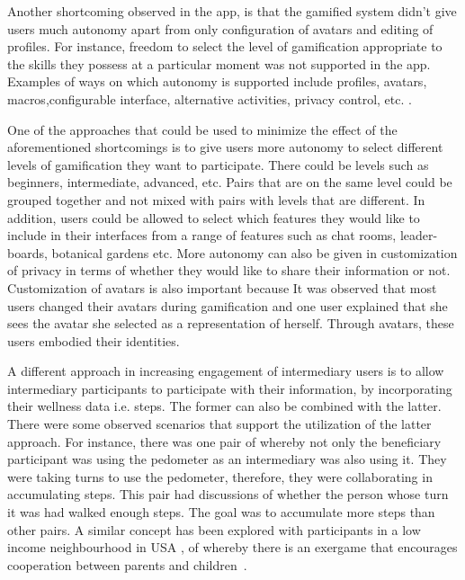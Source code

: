 Another shortcoming observed in the app, is that the gamified system didn't give users much autonomy apart from only configuration of avatars and editing of profiles. For instance, freedom to select the level of gamification appropriate to the skills they possess at a particular moment was not supported in the app. Examples of ways on which autonomy is supported include profiles, avatars, macros,configurable interface, alternative activities, privacy control, etc. \citep{francisco2012analysis}. 

One of the approaches that could be used to minimize the effect of the  aforementioned shortcomings is to give users more autonomy to select different levels of gamification they want to participate. There could be levels such as beginners, intermediate, advanced, etc. Pairs that are on the same level could be grouped together and not mixed with pairs with levels that are different. In addition, users could be allowed to select which features they would like to include in their interfaces from a range of features such as chat rooms, leader-boards, botanical gardens etc. More autonomy can also be given in customization of privacy in terms of whether they would like to share their information or not. Customization of avatars is also important because It was observed that most users changed their avatars during gamification and one user explained that she sees the avatar she selected as a representation of herself. Through avatars, these users embodied their identities.
 
A different approach in increasing engagement of intermediary users is  to allow intermediary participants to participate with their information, by incorporating their wellness data i.e. steps. The former can also be combined with the latter. There were some observed scenarios that support the utilization of the latter approach. For instance, there was one pair of whereby not only the beneficiary participant was using the pedometer as an intermediary was also using it. They were taking turns to use the pedometer, therefore, they were collaborating in accumulating steps. This pair had discussions of whether the person whose turn it was had walked enough steps. The goal was to accumulate more steps than other pairs. A similar concept has been explored with participants in a low income neighbourhood in USA , of whereby there is an exergame that encourages cooperation between parents and children~\citep{saksono2015spaceship}.

